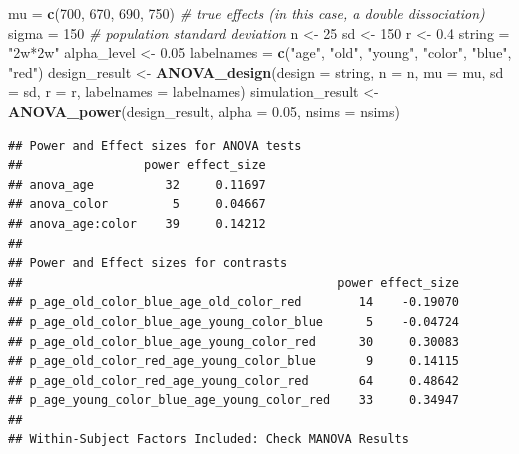 \documentclass[]{book}
\newenvironment{Shaded}{\begin{snugshade}}{\end{snugshade}}
\newcommand{\CommentTok}[1]{\textcolor[rgb]{0.56,0.35,0.01}{\textit{#1}}}
\newcommand{\DataTypeTok}[1]{\textcolor[rgb]{0.13,0.29,0.53}{#1}}
\newcommand{\DecValTok}[1]{\textcolor[rgb]{0.00,0.00,0.81}{#1}}
\newcommand{\FloatTok}[1]{\textcolor[rgb]{0.00,0.00,0.81}{#1}}
\newcommand{\KeywordTok}[1]{\textcolor[rgb]{0.13,0.29,0.53}{\textbf{#1}}}
\newcommand{\NormalTok}[1]{#1}
\newcommand{\StringTok}[1]{\textcolor[rgb]{0.31,0.60,0.02}{#1}}
\begin{document}
\begin{Shaded}
\begin{Highlighting}[]
\NormalTok{mu =}\StringTok{ }\KeywordTok{c}\NormalTok{(}\DecValTok{700}\NormalTok{, }\DecValTok{670}\NormalTok{, }\DecValTok{690}\NormalTok{, }\DecValTok{750}\NormalTok{) }\CommentTok{# true effects (in this case, a double dissociation)}
\NormalTok{sigma =}\StringTok{ }\DecValTok{150}  \CommentTok{# population standard deviation}
\NormalTok{n <-}\StringTok{ }\DecValTok{25}
\NormalTok{sd <-}\StringTok{ }\DecValTok{150}
\NormalTok{r <-}\StringTok{ }\FloatTok{0.4}
\NormalTok{string =}\StringTok{ "2w*2w"}
\NormalTok{alpha_level <-}\StringTok{ }\FloatTok{0.05}
\NormalTok{labelnames =}\StringTok{ }\KeywordTok{c}\NormalTok{(}\StringTok{"age"}\NormalTok{, }\StringTok{"old"}\NormalTok{, }\StringTok{"young"}\NormalTok{, }\StringTok{"color"}\NormalTok{, }\StringTok{"blue"}\NormalTok{, }\StringTok{"red"}\NormalTok{)}
\NormalTok{design_result <-}\StringTok{ }\KeywordTok{ANOVA_design}\NormalTok{(}\DataTypeTok{design =}\NormalTok{ string,}
                              \DataTypeTok{n =}\NormalTok{ n, }
                              \DataTypeTok{mu =}\NormalTok{ mu, }
                              \DataTypeTok{sd =}\NormalTok{ sd, }
                              \DataTypeTok{r =}\NormalTok{ r, }
                              \DataTypeTok{labelnames =}\NormalTok{ labelnames)}
\NormalTok{simulation_result <-}\StringTok{ }\KeywordTok{ANOVA_power}\NormalTok{(design_result, }\DataTypeTok{alpha =} \FloatTok{0.05}\NormalTok{, }\DataTypeTok{nsims =}\NormalTok{ nsims)}
\end{Highlighting}
\end{Shaded}

\begin{verbatim}
## Power and Effect sizes for ANOVA tests
##                 power effect_size
## anova_age          32     0.11697
## anova_color         5     0.04667
## anova_age:color    39     0.14212
## 
## Power and Effect sizes for contrasts
##                                            power effect_size
## p_age_old_color_blue_age_old_color_red        14    -0.19070
## p_age_old_color_blue_age_young_color_blue      5    -0.04724
## p_age_old_color_blue_age_young_color_red      30     0.30083
## p_age_old_color_red_age_young_color_blue       9     0.14115
## p_age_old_color_red_age_young_color_red       64     0.48642
## p_age_young_color_blue_age_young_color_red    33     0.34947
## 
## Within-Subject Factors Included: Check MANOVA Results
\end{verbatim}
\end{document}
